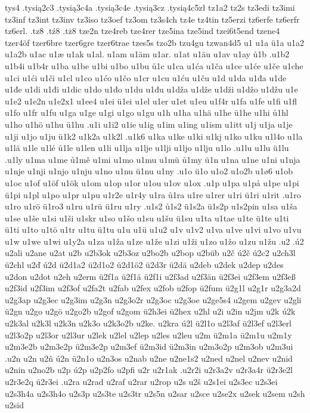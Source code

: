 {{tys4
.tysią2c3
.tysią3c4a
.tysią3c4e
.tysią3cz
.tysią4c5zł
tz1a2
tz2s
tz3edi
tz3imi
tz3inf
tz3int
tz3inv
tz3iso
tz3oef
tz3om
tz3s4ch
tz4e
tz4tin
tz5erzi
tz6erfe
tz6erfr
tz6erl.
.tz8
.tź8
.tż8
tze2n
tze4reb
tze4rer
tze5ina
tze5ind
tzei6t5end
tzene4
tzer4öf
tzer6bre
tzer6gre
tzer6trae
tzes5s
tzo2b
tzu4gu
tzwan4d5
u1
u1a
ü1a
u1a2
u1a2b
u1ac
u1æ
u1ak
u1al.
u1am
u1äm
u1ar.
u1at
u1äu
u1av
u1ay
ů1b
.u1b2
u1b4i
u1b4r
u1ba
u1be
u1bi
u1bo
u1bu
ů1c
u1ca
u1ća
u1ča
u1ce
u1će
u1če
u1che
u1ci
u1ći
u1či
u1cl
u1co
u1ćo
u1čo
u1cr
u1cu
u1ću
u1ču
u1d
u1da
u1đa
u1de
u1đe
u1di
u1đi
u1dic
u1do
u1đo
u1du
u1đu
u1dža
u1dže
u1dži
u1džo
u1džu
u1e
u1e2
u1e2n
u1e2x1
u1ee4
u1ei
ü1ei
u1el
u1er
u1et
u1eu
u1f4r
u1fa
u1fe
u1fi
u1fl
u1fo
u1fr
u1fu
u1ga
u1ge
u1gi
u1go
u1gu
u1h
u1ha
u1hä
u1he
ü1he
u1hi
ů1hl
u1ho
u1hö
u1hu
ü1hu
.u1i
u1i2
u1ie
u1ig
u1im
u1ing
u1ism
u1itt
u1j
u1ja
u1je
u1ji
u1jo
u1ju
ü1k2
u1k2a
u1k2l
.u1k6
u1ka
u1ke
u1ki
u1kj
u1ko
u1ku
u1l4o
u1la
u1lä
u1le
u1lé
ů1le
u1len
u1li
u1lja
u1lje
u1lji
u1ljo
u1lju
u1lo
.u1lu
u1lu
ü1lu
.u1ly
u1ma
u1me
ů1mě
u1mi
u1mo
u1mu
u1mü
ů1my
ü1n
u1na
u1ne
u1ni
u1nja
u1nje
u1nji
u1njo
u1nju
u1no
u1nu
ü1nu
u1ny
.u1o
ü1o
u1o2
u1o2b
u1ø6
u1ob
u1oc
u1of
u1öf
u1ök
u1om
u1op
u1or
u1ou
u1ov
u1ox
.u1p
u1pa
u1på
u1pe
u1pi
ü1pi
u1pl
u1po
u1pr
u1pu
u1r2e
u1r4y
u1ra
ů1ra
u1re
u1rer
u1ri
ü1ri
u1rit
.u1ro
u1ro
u1rö
ü1ro3
u1ru
u1rü
ü1ru
u1ry
.u1s2
ů1s2
ü1s2a
ü1s2p
u1s2pin
u1sa
u1ša
u1se
u1še
u1si
u1ši
u1skr
u1so
u1šo
u1su
u1šu
ü1su
u1ta
u1tae
u1te
ü1te
u1ti
ü1ti
u1to
u1tö
u1tr
u1tu
ü1tu
u1u
u1ü
u1u2
u1v
u1v2
u1va
u1ve
u1vi
u1vo
u1vu
u1w
u1we
u1wi
u1y2a
u1za
u1ža
u1ze
u1že
u1zi
u1ži
u1zo
u1žo
u1zu
u1žu
.u2
.ú2
u2ali
u2ane
u2at
u2b
u2b3ok
u2b3oz
u2bo2b
u2bop
u2büb
u2č
ú2č
ú2c2
u2ch3l
ü2chl
u2ď
ú2d
ü2d1a2
ü2d1o2
ü2d1ö2
ü2d3r
ü2dä
u2deb
u2dek
u2dep
u2des
u2don
u2dot
u2eh
u2erm
ü2f1a
ü2f1ä
ü2f1i
u2f3ad
u2f3än
ü2f3ei
u2f3em
u2f3eß
u2f3id
u2f3im
u2f3of
u2fa2t
u2fab
u2fex
u2fob
u2fop
ü2fum
ü2g1l
u2g1r
u2g3a2d
u2g3ap
u2g3ec
u2g3im
u2g3n
u2g3o2r
u2g3oc
u2g3oe
u2ge5s4
u2gem
u2gev
u2gli
ü2gn
u2go
u2gö
u2go2b
u2gof
u2gom
ü2h3ei
ü2hex
u2hl
u2i
u2in
u2jm
u2k
ú2k
u2k3al
u2k3l
u2k3n
u2k3o
u2k3o2b
u2ke.
u2kra
ú2l
ü2l1o
u2l3af
ü2l3ef
u2l3erl
u2l3o2p
u2l3or
u2l3ur
u2lek
u2lel
u2lep
u2les
u2leu
u2m
ü2m1a
ü2m1u
u2m1y
u2m3e2b
u2m3e2p
ü2m3e2p
u2m3ef
ü2m3id
ü2m3in
u2m3o2p
u2m3ob
u2m3ui
.u2n
u2n
u2ň
ú2n
ü2n1o
u2n3os
u2nab
u2ne
u2ne1s2
u2ned
u2nel
u2nev
u2nid
u2nin
u2no2b
u2p
ú2p
u2p2fo
u2pfi
u2r
u2r1ak
.u2r2i
u2r3a2v
u2r3a4r
ü2r3e2l
u2r3e2q
ü2r3ei
.u2ra
u2rad
u2raf
u2rar
u2rop
u2s
u2š
u2s1ei
u2s3ec
u2s3ei
u2s3h4a
u2s3h4o
u2s3p
u2s3te
u2s3tr
u2s5n
u2sar
u2sce
u2se2x
u2sek
u2sem
u2sh
u2sid
}}
